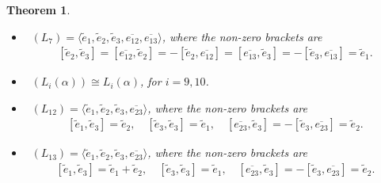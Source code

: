 \documentclass[11pt,a4paper]{amsart}
\theoremstyle{plain}
\newtheorem{theorem}[subsection]{Theorem}
\theoremstyle{definition}
\theoremstyle{remark}
\numberwithin{equation}{section}
\newcommand{\0}{\emptyset}
\DeclareMathOperator{\holL}{hol_{Lie}}
\newcommand{\ov}[1]{\overline{#1}}
\begin{document}
\begin{theorem}
\begin{itemize}[itemsep=0.35em]
		\item  $\holL(L_7)=\langle \widetilde{e}_1,\widetilde{e}_2,\widetilde{e}_3,\ov{e_{12}},\ov{e_{13}} \rangle$, where the non-zero brackets are
		      \begin{gather*}
		      	\left[\widetilde{e}_2,\widetilde{e}_3\right]=
		      	\left[\ov{e_{12}},\widetilde{e}_2\right] = -\left[\widetilde{e}_2,\ov{e_{12}}\right] = 
		      	\left[\ov{e_{13}},\widetilde{e}_3\right] = -\left[\widetilde{e}_3,\ov{e_{13}}\right] = \widetilde{e}_1.
		      \end{gather*}
		      
		\item  $\holL(L_i(\alpha)) \cong L_i(\alpha)$, for $i=9,10$.
		      
		\item  $\holL(L_{12})=\langle \widetilde{e}_1,\widetilde{e}_2,\widetilde{e}_3,\ov{e_{23}} \rangle$, where the non-zero brackets are
		      \begin{gather*}
		      	\left[\widetilde{e}_1,\widetilde{e}_3\right]=\widetilde{e}_2, \quad \left[\widetilde{e}_3,\widetilde{e}_3\right]=\widetilde{e}_1, \quad \left[\ov{e_{23}},\widetilde{e}_3\right] = -\left[\widetilde{e}_3,\ov{e_{23}}\right] = \widetilde{e}_2.
		      \end{gather*}
		      
		\item  $\holL(L_{13})=\langle \widetilde{e}_1,\widetilde{e}_2,\widetilde{e}_3,\ov{e_{23}} \rangle$, where the non-zero brackets are
		      \begin{gather*}
		      	\left[\widetilde{e}_1,\widetilde{e}_3\right]=\widetilde{e}_1+\widetilde{e}_2, \quad \left[\widetilde{e}_3,\widetilde{e}_3\right]=\widetilde{e}_1, \quad \left[\ov{e_{23}},\widetilde{e}_3\right] = -\left[\widetilde{e}_3,\ov{e_{23}}\right] = \widetilde{e}_2.
		      \end{gather*}
	\end{itemize}
\end{theorem}
\end{document}
